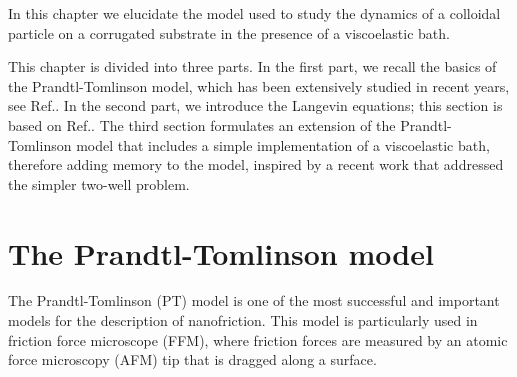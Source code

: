 In this chapter we elucidate the model used to study the dynamics of a colloidal particle on a corrugated substrate in the presence of a viscoelastic bath.

This chapter is divided into three parts. In the first part, we recall the basics of the Prandtl-Tomlinson model, which has been extensively studied in recent years, see Ref.\cite{vanossi2013}. 
In the second part, we introduce the Langevin equations; this section is based on Ref.\cite{RKubo_1966}. 
The third section formulates an extension of the Prandtl-Tomlinson model that includes a simple implementation of a viscoelastic bath, therefore adding memory to the model, inspired by a recent work \cite{ginot2022} that addressed the simpler two-well problem.
\section{The Prandtl-Tomlinson model} \label{PTmodel}
\noindent The Prandtl-Tomlinson (PT) model is one of the most successful and important models for the description of nanofriction. 
This model is particularly used in friction force microscope (FFM), where friction forces are measured by an atomic force microscopy (AFM) tip that is dragged along a surface.

